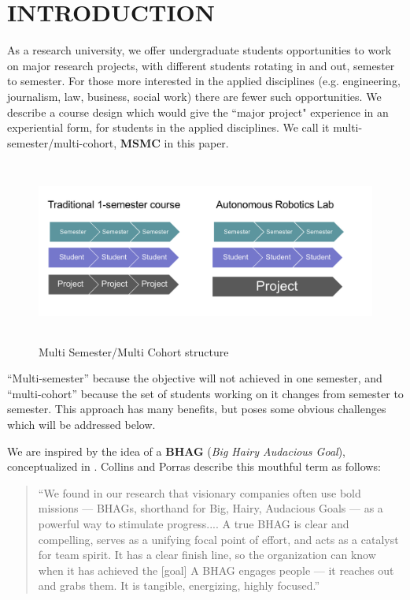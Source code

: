 \section{INTRODUCTION}

As a research university, we offer undergraduate students opportunities to work on major research projects, with different students rotating in and out, semester to semester. For those more interested in the applied disciplines (e.g. engineering, journalism, law, business, social work) there are fewer such opportunities. We describe a course design which would give the ``major project" experience in an experiential form, for students in the applied disciplines. We call it multi-semester/multi-cohort, \textbf{MSMC} in this paper.

\begin{figure}[!ht]
  \centering
  \includegraphics[width=\columnwidth,height=6cm]{diag1}
  \caption{Multi Semester/Multi Cohort structure}
  \label{fig:diag1}
\end{figure}

``Multi-semester'' because the objective will not achieved in one semester, and ``multi-cohort'' because the set of students working on it changes from semester to semester. This approach has many benefits, but poses some obvious challenges which will be addressed below.

We are inspired by the idea of a \textbf{BHAG} (\textit{Big Hairy Audacious Goal}), conceptualized in \cite{Collins}. Collins and Porras describe this mouthful term as follows:

\begin{quote}
``We found in our research that visionary companies often use bold missions --- BHAGs, shorthand for Big, Hairy, Audacious Goals --- as a powerful way to stimulate progress.... A true BHAG is clear and compelling, serves as a unifying focal point of effort, and acts as a catalyst for team spirit. It has a clear finish line, so the organization can know when it has achieved the [goal] A BHAG engages people --- it reaches out and grabs them. It is tangible, energizing, highly focused.\cite{Collins}''
\end{quote}

